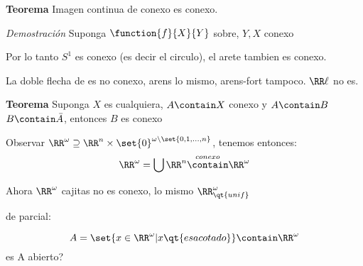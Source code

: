 \textbf{Teorema} Imagen continua de conexo es conexo.

\textit{Demostración} Suponga $ \function{f}{X}{Y} $ sobre, $ Y,X $ conexo

Por lo tanto $ S^1 $ es conexo (es decir el circulo), el arete tambien es conexo.

La doble flecha de es no conexo, arens lo mismo, arens-fort tampoco. $ \RR\ell $ no es. 

\textbf{Teorema} Suponga $X$ es cualquiera, $ A \contain X $ conexo y $ A \contain B$ $B \contain \bar{A} $, entonces $ B $ es conexo

Observar $ \RR^\omega \supseteq \RR^{n} \times \set{0}^{\omega \backslash \set{0,1, \ldots,n}} $, tenemos entonces:
\[ \RR^{\omega} = \bigcup\RR^n \overset{conexo }{\contain} \RR^{\omega} \]

Ahora $ \RR^{\omega} $ cajitas no es conexo, lo mismo $ \RR^{\omega}_{\qt{unif}} $

de parcial:

\[ A = \set{x \in \RR^{\omega} | x \qt{ es acotado }} \contain \RR^{\omega} \]
es A abierto?



